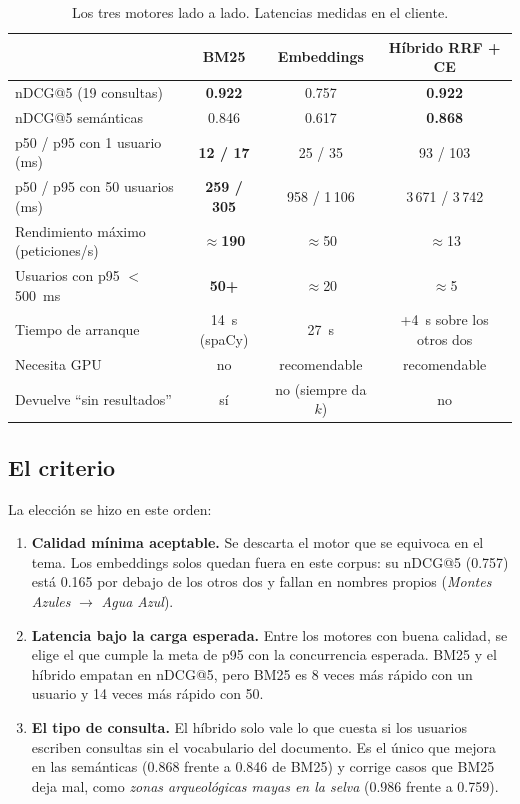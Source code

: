 \documentclass[11pt,letterpaper]{article}
\begin{document}
\begin{table}[H]
\centering
\caption{Los tres motores lado a lado. Latencias medidas en el cliente.}
\label{tab:decision}
\begin{tabular}{lccc}
\toprule
 & BM25 & Embeddings & Híbrido RRF + CE \\
\midrule
nDCG@5 (19 consultas) & \textbf{0.922} & 0.757 & \textbf{0.922} \\
nDCG@5 semánticas & 0.846 & 0.617 & \textbf{0.868} \\
p50 / p95 con 1 usuario (ms) & \textbf{12 / 17} & 25 / 35 & 93 / 103 \\
p50 / p95 con 50 usuarios (ms) & \textbf{259 / 305} & 958 / 1\,106 & 3\,671 / 3\,742 \\
Rendimiento máximo (peticiones/s) & \textbf{$\approx$190} & $\approx$50 & $\approx$13 \\
Usuarios con p95 $<$ 500~ms & \textbf{50+} & $\approx$20 & $\approx$5 \\
Tiempo de arranque & 14~s (spaCy) & 27~s & +4~s sobre los otros dos \\
Necesita GPU & no & recomendable & recomendable \\
Devuelve ``sin resultados'' & sí & no (siempre da $k$) & no \\
\bottomrule
\end{tabular}
\end{table}

\subsection{El criterio}

La elección se hizo en este orden:
\begin{enumerate}
\item \textbf{Calidad mínima aceptable.} Se descarta el motor que se equivoca en el tema. Los embeddings solos quedan fuera en este corpus: su nDCG@5 (0.757) está 0.165 por debajo de los otros dos y fallan en nombres propios (\emph{Montes Azules} $\to$ \emph{Agua Azul}).
\item \textbf{Latencia bajo la carga esperada.} Entre los motores con buena calidad, se elige el que cumple la meta de p95 con la concurrencia esperada. BM25 y el híbrido empatan en nDCG@5, pero BM25 es 8 veces más rápido con un usuario y 14 veces más rápido con 50.
\item \textbf{El tipo de consulta.} El híbrido solo vale lo que cuesta si los usuarios escriben consultas sin el vocabulario del documento. Es el único que mejora en las semánticas (0.868 frente a 0.846 de BM25) y corrige casos que BM25 deja mal, como \emph{zonas arqueológicas mayas en la selva} (0.986 frente a 0.759).
\end{enumerate}
\end{document}
